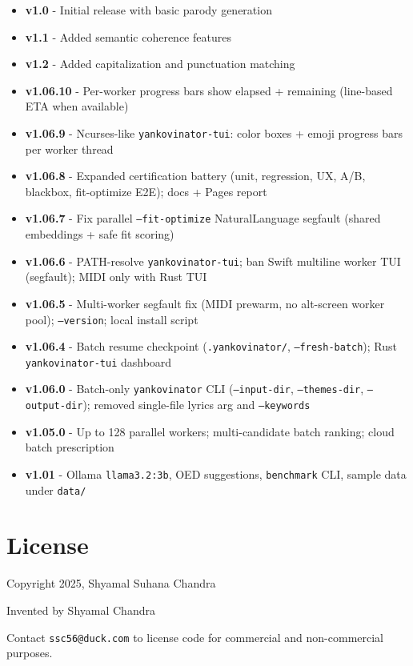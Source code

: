 \documentclass[11pt,a4paper]{article}
\begin{document}
\begin{itemize}
    \item \textbf{v1.0} - Initial release with basic parody generation
    \item \textbf{v1.1} - Added semantic coherence features
    \item \textbf{v1.2} - Added capitalization and punctuation matching
    \item \textbf{v1.06.10} - Per-worker progress bars show elapsed + remaining (line-based ETA when available)
    \item \textbf{v1.06.9} - Ncurses-like \texttt{yankovinator-tui}: color boxes + emoji progress bars per worker thread
    \item \textbf{v1.06.8} - Expanded certification battery (unit, regression, UX, A/B, blackbox, fit-optimize E2E); docs + Pages report
    \item \textbf{v1.06.7} - Fix parallel \texttt{--fit-optimize} NaturalLanguage segfault (shared embeddings + safe fit scoring)
    \item \textbf{v1.06.6} - PATH-resolve \texttt{yankovinator-tui}; ban Swift multiline worker TUI (segfault); MIDI only with Rust TUI
    \item \textbf{v1.06.5} - Multi-worker segfault fix (MIDI prewarm, no alt-screen worker pool); \texttt{--version}; local install script
    \item \textbf{v1.06.4} - Batch resume checkpoint (\texttt{.yankovinator/}, \texttt{--fresh-batch}); Rust \texttt{yankovinator-tui} dashboard
    \item \textbf{v1.06.0} - Batch-only \texttt{yankovinator} CLI (\texttt{--input-dir}, \texttt{--themes-dir}, \texttt{--output-dir}); removed single-file lyrics arg and \texttt{--keywords}
    \item \textbf{v1.05.0} - Up to 128 parallel workers; multi-candidate batch ranking; cloud batch prescription
    \item \textbf{v1.01} - Ollama \texttt{llama3.2:3b}, OED suggestions, \texttt{benchmark} CLI, sample data under \texttt{data/}
\end{itemize}

\section{License}

Copyright \textcopyright{} 2025, Shyamal Suhana Chandra

Invented by Shyamal Chandra

Contact \texttt{ssc56@duck.com} to license code for commercial and non-commercial purposes.
\end{document}
